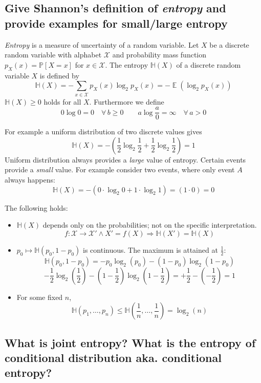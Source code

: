 \documentclass[a4paper]{article}
\newcommand\op[2][P]{\mathbb{#1}\left(#2\right)}
\newcommand\os[2][P]{\mathbb{#1}\left[#2\right]}
\newcommand\key[1]{\textit{#1}}
\DeclareMathOperator{\Ex}{\mathbb{E}}
\theoremstyle{definition}
\begin{document}
\subsection{Give Shannon's definition of \key{entropy} and provide examples for small/large entropy}

\key{Entropy} is a measure of uncertainty of a random variable. Let $X$ be a discrete random variable with alphabet $\mathcal{X}$ and probability mass function $p_X(x) = \os{X = x}$ for $x \in \mathcal{X}$. The entropy $\op[H]{X}$ of a discrete random variable $X$ is defined by
\[ \op[H]{X} = -\sum_{x \in \mathcal{X}} p_X(x) \log_2{p_X(x)} = -\Ex(\log_2 p_X(x)) \]
$\op[H]{X} \geq 0$ holds for all $X$. Furthermore we define
\[
  0 \log 0 = 0              \quad \forall\, b \geq 0 \qquad
  a \log \frac a0 = \infty  \quad \forall\, a > 0
\]

For example a uniform distribution of two discrete values gives
\[ \op[H]{X} = - \left(\frac12 \log_2{\frac12} + \frac12 \log_2{\frac12} \right) = 1 \]
Uniform distribution always provides a \key{large} value of entropy. Certain events provide a \key{small} value. For example consider two events, where only event $A$ always happens:
\[ \op[H]{X} = - \left(0\cdot\log_2{0} + 1\cdot\log_2{1}\right) = \left(1\cdot0\right) = 0 \]

The following holds:
\begin{itemize}
  \item $\op[H]{X}$ depends only on the probabilities; not on the specific interpretation.
        \[ f: \mathcal{X} \rightarrow \mathcal{X}' \land X' = f(X) \Rightarrow \op[H]{X'} = \op[H]{X} \]
  \item $p_0 \mapsto \op[H]{p_0, 1 - p_0}$ is continuous. The maximum is attained at $\frac12$:
        \[ \op[H]{p_0, 1 - p_0} = -p_0 \log_2(p_0) - (1 - p_0) \log_2(1 - p_0) \]
        \[
           -\frac12 \log_2\left(\frac12\right)
           - \left(1 - \frac12\right) \log_2 \left(1 - \frac12\right)
           = +\frac12 - \left(-\frac12\right)
           = 1
        \]
  \item For some fixed $n$,
        \[ \op[H]{p_1, \ldots, p_n} \leq \op[H]{\frac1n, \ldots, \frac1n} = \log_2(n) \]
\end{itemize}

\subsection{What is joint entropy? What is the entropy of conditional distribution aka. conditional entropy?}
\end{document}

